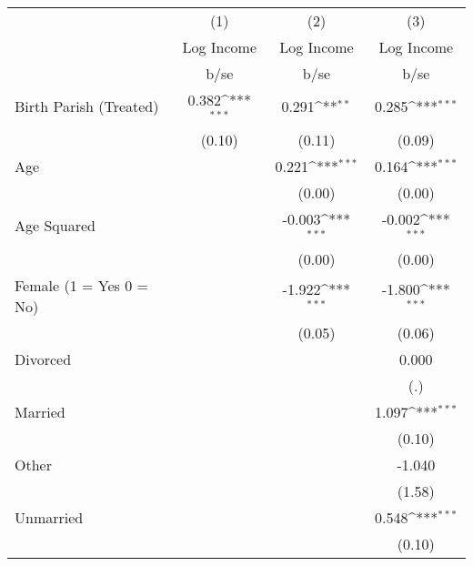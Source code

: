 {
\def\sym#1{\ifmmode^{#1}\else\(^{#1}\)\fi}
\begin{tabular}{l*{3}{c}}
\hline\hline
                    &\multicolumn{1}{c}{(1)}&\multicolumn{1}{c}{(2)}&\multicolumn{1}{c}{(3)}\\
                    &\multicolumn{1}{c}{Log Income}&\multicolumn{1}{c}{Log Income}&\multicolumn{1}{c}{Log Income}\\
                    &        b/se         &        b/se         &        b/se         \\
\hline
Birth Parish (Treated)&       0.382\sym{***}&       0.291\sym{**} &       0.285\sym{***}\\
                    &      (0.10)         &      (0.11)         &      (0.09)         \\
Age                 &                     &       0.221\sym{***}&       0.164\sym{***}\\
                    &                     &      (0.00)         &      (0.00)         \\
Age Squared         &                     &      -0.003\sym{***}&      -0.002\sym{***}\\
                    &                     &      (0.00)         &      (0.00)         \\
Female (1 = Yes 0 = No)&                     &      -1.922\sym{***}&      -1.800\sym{***}\\
                    &                     &      (0.05)         &      (0.06)         \\
Divorced            &                     &                     &       0.000         \\
                    &                     &                     &         (.)         \\
Married             &                     &                     &       1.097\sym{***}\\
                    &                     &                     &      (0.10)         \\
Other               &                     &                     &      -1.040         \\
                    &                     &                     &      (1.58)         \\
Unmarried           &                     &                     &       0.548\sym{***}\\
                    &                     &                     &      (0.10)         \\

\end{tabular}}
